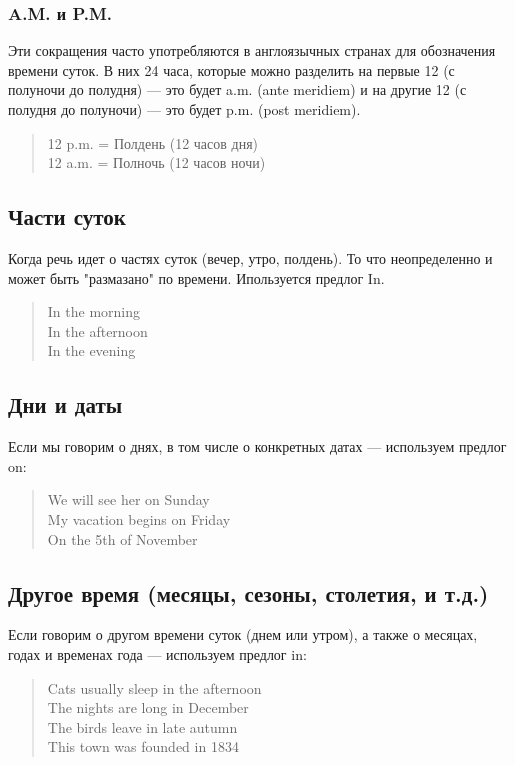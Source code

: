 \subsubsection{A.M. и P.M.}
 Эти сокращения часто употребляются в англоязычных странах для обозначения времени суток. В них 24 часа, которые можно разделить на первые 12 (с полуночи до полудня) — это будет a.m. (ante meridiem) и на другие 12 (с полудня до полуночи) — это будет p.m. (post meridiem).
 
 \begin{quote}
 	12 p.m. = Полдень (12 часов дня)\\
 	12 a.m. = Полночь (12 часов ночи)
 \end{quote}
 
 \subsection{Части суток}
 Когда речь идет о частях суток (вечер, утро, полдень). То что неопределенно и может быть "размазано" по времени. Ипользуется предлог In.
  \begin{quote}
 	In the morning\\
 	In the afternoon\\
 	In the evening
 \end{quote}

\subsection{Дни и даты}
Если мы говорим о днях, в том числе о конкретных датах — используем предлог on: 
\begin{quote}
	We will see her on Sunday\\
	My vacation begins on Friday\\
	On the 5th of November
\end{quote}

\subsection{Другое время (месяцы, сезоны, столетия, и т.д.)}

Если говорим о другом времени суток (днем или утром), а также о месяцах, годах и временах года — используем предлог in: 
\begin{quote}
	Cats usually sleep in the afternoon\\
	The nights are long in December \\
	The birds leave in late autumn \\
	This town was founded in 1834
\end{quote}

